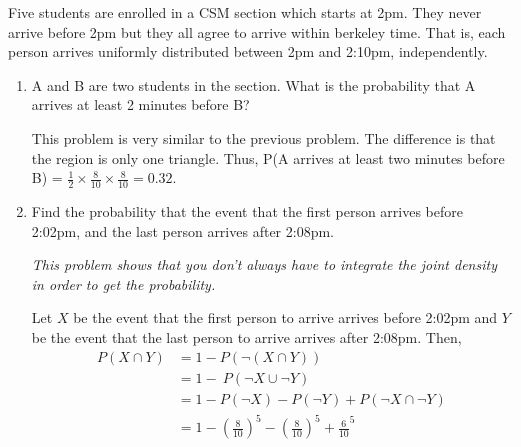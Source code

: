 \question Five students are enrolled in a CSM section which starts at 2pm. They never arrive before 2pm but they all agree to arrive within berkeley time. That is, each person arrives uniformly distributed between 2pm and 2:10pm, independently. 

\begin{enumerate}[label=(\alph*)] 
\item A and B are two students in the section. What is the probability that A arrives at least 2 minutes before B? 
\begin{solution}[4cm] 
This problem is very similar to the previous problem. The difference is that the region is only one triangle. Thus, P(A arrives at least two minutes before B) = $\frac{1}{2} \times \frac{8}{10} \times \frac{8}{10} = 0.32$. 
\end{solution}

\item Find the probability that the event that the first person arrives before 2:02pm, and the last person arrives after 2:08pm. 
\begin{solution}[4cm] 
\textit{This problem shows that you don't always have to integrate the joint density in order to get the probability.} 

Let $X$ be the event that the first person to arrive arrives before 2:02pm and $Y$ be the event that the last person to arrive arrives after 2:08pm. Then, 
\begin{align*}
    P(X \cap Y) &= 1 - P(\neg (X \cap Y)) \\
                &= 1 - \ P(\neg X \cup \neg Y) \\
                &= 1 - P(\neg X) - P(\neg Y) + P(\neg X \cap \neg Y) \\
                &= 1 - (\frac{8}{10})^5 - (\frac{8}{10})^5+ {\frac{6}{10}}^5
\end{align*}

\end{solution}
\end{enumerate}
